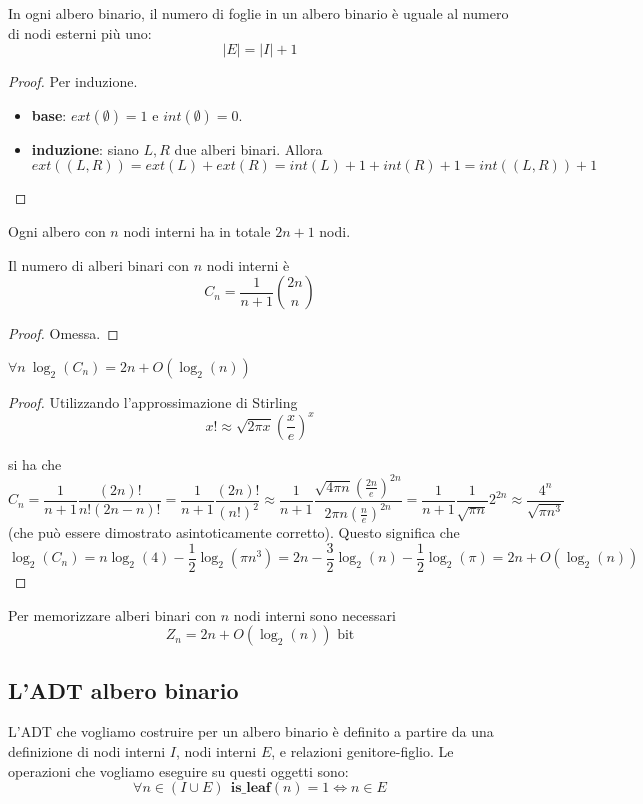 \begin{theorem} \label{thm:btree_leaves}
	In ogni albero binario, il numero di foglie in un albero binario è uguale al numero di nodi esterni più uno:
	$$
		|E| = |I| + 1
	$$
\end{theorem}
\begin{proof}
	Per induzione.
	\begin{itemize}
		\item{\bf base}: $ext(\emptyset) = 1$ e $int(\emptyset) = 0$.
		\item{\bf induzione}: siano $L, R$ due alberi binari. Allora
		$$
			ext((L,R)) = ext(L) + ext(R) = int(L) + 1 + int(R) + 1 = int((L, R))  + 1
		$$
	\end{itemize}
\end{proof}

\begin{corollario}
	Ogni albero con $n$ nodi interni ha in totale $2n +1$ nodi.
\end{corollario}

\begin{theorem}[di Catalan]\label{thm:catalan}
	Il numero di alberi binari con $n$ nodi interni è
	$$
		C_n = \frac{1}{n+1}{2n \choose n}
	$$
\end{theorem}
\begin{proof}
	Omessa.
\end{proof}
\begin{corollario}
	$ \forall n ~ \log_2(C_n)  =2n + O(\log_2(n)) $
\end{corollario}
\begin{proof}
	Utilizzando l'approssimazione di Stirling
	$$
		x! \approx \sqrt{2\pi x} (\frac{x}{e})^x
	$$

	si ha che
	$$
		C_n = \frac{1}{n+1} \frac{(2n)!}{n! (2n - n)!} = \frac{1}{n+1}\frac{(2n)!}{(n!)^2} \approx
		\frac{1}{n+1} \frac{\sqrt{4 \pi n} (\frac{2n}{e})^{2n}}{2 \pi n (\frac{n}{e})^{2n}}
		= \frac{1}{n+1} \frac{1}{\sqrt{\pi n }} 2^{2n} \approx \frac{4^n}{\sqrt{\pi n^3}}
	$$
	(che può essere dimostrato asintoticamente corretto).
	Questo significa che
	$$
		\log_2(C_n) = n \log_2(4) - \frac{1}{2}\log_2(\pi n^3)
		= 2n - \frac{3}{2}\log_2(n) - \frac{1}{2}\log_2(\pi)
		= 2n + O(\log_2(n))
	$$
\end{proof}
\begin{corollario}
	Per memorizzare alberi binari con $n$ nodi interni sono necessari
	$$
		Z_n = 2n + O(\log_2(n)) \text{ bit}
	$$
\end{corollario}

\subsection{L'ADT albero binario}
L'ADT che vogliamo costruire per un albero binario è definito a partire da una definizione
di nodi interni $I$, nodi interni $E$, e relazioni genitore-figlio. Le operazioni
che vogliamo eseguire su questi oggetti sono:
$$
	\forall n \in (I \cup E) ~~ \mathbf{is\_leaf}(n) = 1 \iff n \in  E
$$


